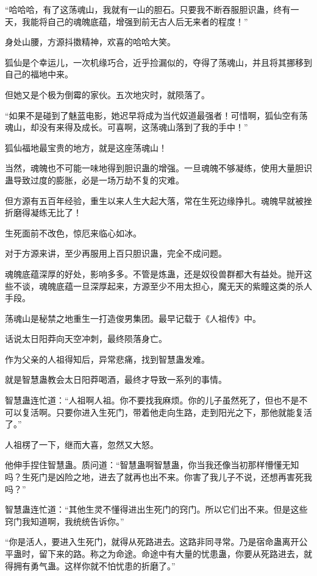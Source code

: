\begin{this_body}
“哈哈哈，有了这荡魂山，我就有一山的胆石。只要我不断吞服胆识蛊，终有一天，我能将自己的魂魄底蕴，增强到前无古人后无来者的程度！”

身处山腰，方源抖擞精神，欢喜的哈哈大笑。

狐仙是个幸运儿，一次机缘巧合，近乎捡漏似的，夺得了荡魂山，并且将其挪移到自己的福地中来。

但她又是个极为倒霉的家伙。五次地灾时，就陨落了。

“如果不是碰到了魅蓝电影，她迟早将成为当代奴道最强者！可惜啊，狐仙空有荡魂山，却没有来得及成长。可喜啊，这荡魂山落到了我的手中！”

狐仙福地最宝贵的地方，就是这座荡魂山！

当然，魂魄也不可能一味地得到胆识蛊的增强。一旦魂魄不够凝练，使用大量胆识蛊导致过度的膨胀，必是一场万劫不复的灾难。

但方源有五百年经验，重生以来人生大起大落，常在生死边缘挣扎。魂魄早就被挫折磨得凝练无比了！

生死面前不改色，惊厄来临心如冰。

对于方源来讲，至少再服用上百只胆识蛊，完全不成问题。

魂魄底蕴深厚的好处，影响多多。不管是炼蛊，还是奴役兽群都大有益处。抛开这些不谈，魂魄底蕴一旦深厚起来，方源至少不用太担心，魔无天的紫瞳这类的杀人手段。

荡魂山是秘禁之地重生一打造俊男集团。最早记载于《人祖传》中。

话说太日阳莽向天空冲刺，最终陨落身亡。

作为父亲的人祖得知后，异常悲痛，找到智慧蛊发难。

就是智慧蛊教会太日阳莽喝酒，最终才导致一系列的事情。

智慧蛊连忙道：“人祖啊人祖。你不要找我麻烦。你的儿子虽然死了，但也不是不可以复活啊。只要你进入生死门，带着他走向生路，走到阳光之下，那他就能复活了。”

人祖楞了一下，继而大喜，忽然又大怒。

他伸手捏住智慧蛊。质问道：“智慧蛊啊智慧蛊，你当我还像当初那样懵懂无知吗？生死门是凶险之地，进去了就再也出不来。你害了我儿子不说，还想再害死我吗？”

智慧蛊连忙道：“其他生灵不懂得进出生死门的窍门。所以它们出不来。但是这些窍门我知道啊，我统统告诉你。”

“你是活人，要进入生死门，就得从死路进去。这路非同寻常。乃是宿命蛊离开公平蛊时，留下来的路。称之为命途。命途中有大量的忧患蛊，你要从死路进去，就得拥有勇气蛊。这样你就不怕忧患的折磨了。”


\end{this_body}
